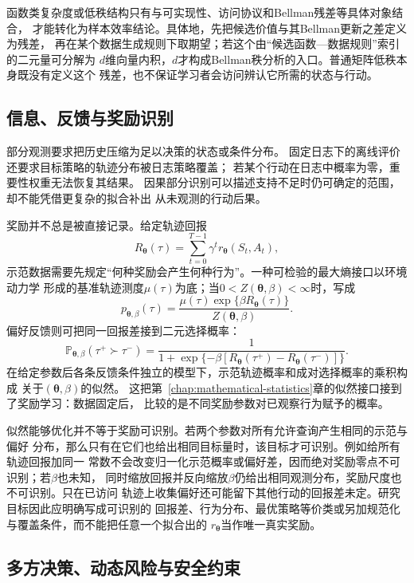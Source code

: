 函数类复杂度或低秩结构只有与可实现性、访问协议和Bellman残差等具体对象结合，
才能转化为样本效率结论。具体地，先把候选价值与其Bellman更新之差定义为残差，
再在某个数据生成规则下取期望；若这个由“候选函数—数据规则”索引的二元量可分解为
$d$维向量内积，$d$才构成Bellman秩分析的入口。普通矩阵低秩本身既没有定义这个
残差，也不保证学习者会访问辨认它所需的状态与行动。

\subsection{信息、反馈与奖励识别}
\label{sec:future-information-feedback-identifiability}

部分观测要求把历史压缩为足以决策的状态或条件分布。
固定日志下的离线评价还要求目标策略的轨迹分布被日志策略覆盖；
若某个行动在日志中概率为零，重要性权重无法恢复其结果。
因果部分识别可以描述支持不足时仍可确定的范围，却不能凭借更复杂的拟合补出
从未观测的行动后果。

奖励并不总是被直接记录。给定轨迹回报
\[
  R_{\bm\theta}(\tau)
  =
  \sum_{t=0}^{T-1}\gamma^t
  r_{\bm\theta}(S_t,A_t),
\]
示范数据需要先规定“何种奖励会产生何种行为”。一种可检验的最大熵接口以环境动力学
形成的基准轨迹测度\(\mu(\tau)\)为底；当\(0<Z(\bm\theta,\beta)<\infty\)时，写成
\[
  p_{\bm\theta,\beta}(\tau)
  =
  \frac{
    \mu(\tau)\exp\{\beta R_{\bm\theta}(\tau)\}
  }{
    Z(\bm\theta,\beta)
  }.
\]
偏好反馈则可把同一回报差接到二元选择概率：
\begin{equation}
  \mathbb{P}_{\bm\theta,\beta}
  (\tau^+\succ\tau^-)
  =
  \frac{1}{
    1+\exp\{-\beta[
      R_{\bm\theta}(\tau^+)-R_{\bm\theta}(\tau^-)
    ]\}
  }.
  \label{eq:future-reward-preference-likelihood}
\end{equation}
在给定参数后各条反馈条件独立的模型下，示范轨迹概率和成对选择概率的乘积构成
关于\((\bm\theta,\beta)\)的似然。
这把第~\ref{chap:mathematical-statistics}章的似然接口接到了奖励学习：数据固定后，
比较的是不同奖励参数对已观察行为赋予的概率。

似然能够优化并不等于奖励可识别。若两个参数对所有允许查询产生相同的示范与偏好
分布，那么只有在它们也给出相同目标量时，该目标才可识别。例如给所有轨迹回报加同一
常数不会改变归一化示范概率或偏好差，因而绝对奖励零点不可识别；若\(\beta\)也未知，
同时缩放回报并反向缩放\(\beta\)仍给出相同观测分布，奖励尺度也不可识别。只在已访问
轨迹上收集偏好还可能留下其他行动的回报差未定。研究目标因此应明确写成可识别的
回报差、行为分布、最优策略等价类或另加规范化与覆盖条件，而不能把任意一个拟合出的
\(r_{\bm\theta}\)当作唯一真实奖励。

\subsection{多方决策、动态风险与安全约束}
\label{sec:future-tasks-participants-risk-safety}

